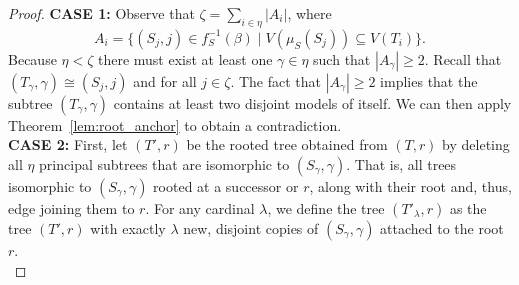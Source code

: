 \documentclass[12pt]{amsart}
\numberwithin{mytheorem}{section} %
\numberwithin{mylemma}{section} %
\numberwithin{mycorollary}{section} %
\begin{document}
\begin{proof}

\noindent
{\bf CASE 1:}
Observe that $\zeta = \sum_{i \in \eta} |A_i|$, where$$A_i = \{(S_j,j) \in f_S^{-1}(\beta) \mid V(\mu_S(S_j)) \subseteq V(T_i)\}.$$Because $\eta < \zeta$ there must exist at least one $\gamma \in \eta$ such that $|A_\gamma| \geq 2$. Recall that $(T_\gamma, \gamma) \cong (S_j, j)$ and for all $j \in \zeta$. The fact that $|A_\gamma| \geq 2$ implies that the subtree $(T_\gamma, \gamma)$ contains at least two disjoint models of itself. We can then apply Theorem~\ref{lem:root_anchor} to obtain a contradiction.\\


\noindent
{\bf CASE 2:} First, let $(T', r)$ be the rooted tree obtained from $(T, r)$ by deleting all $\eta$ principal subtrees that are isomorphic to $(S_\gamma, \gamma)$. That is, all trees isomorphic to $(S_\gamma, \gamma)$ rooted at a successor or $r$, along with their root and, thus, edge joining them to $r$. For any cardinal $\lambda$, we define the tree $(T'_\lambda, r)$ as the tree $(T', r)$ with exactly $\lambda$ new, disjoint copies of $(S_\gamma, \gamma)$ attached to the root $r$.\\


\end{proof}
\end{document}
